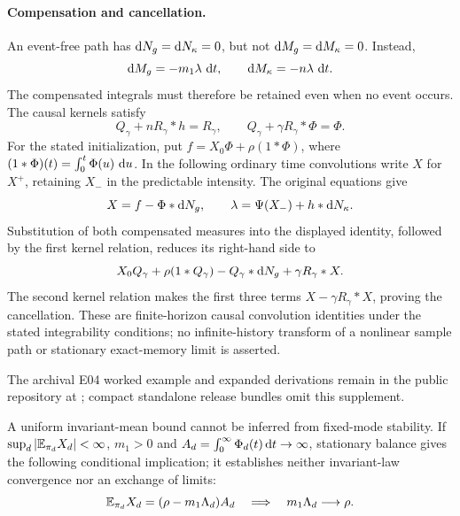 \paragraph{Compensation and cancellation.}
An event-free path has $\mathop{}\!\mathrm{d} N_g=\mathop{}\!\mathrm{d} N_\kappa=0$, but not
$\mathop{}\!\mathrm{d} M_g=\mathop{}\!\mathrm{d} M_\kappa=0$. Instead,
\[
  \mathop{}\!\mathrm{d} M_g=-m_1\lambda\,\mathop{}\!\mathrm{d} t,
  \qquad
  \mathop{}\!\mathrm{d} M_\kappa=-n\lambda\,\mathop{}\!\mathrm{d} t.
\]
The compensated integrals must therefore be retained even when no event
occurs. The causal kernels satisfy
\[
 Q_\gamma+nR_\gamma*h=R_\gamma,
 \qquad
 Q_\gamma+\gamma R_\gamma*\Phi=\Phi.
\]
For the stated initialization, put
$f=X_0\Phi+\rho(1*\Phi)$, where $(1*\Phi)(t)=\int_0^t\Phi(u)\,\mathop{}\!\mathrm{d} u$.
In the following ordinary time convolutions write $X$ for $X^+$, retaining
$X_-$ in the predictable intensity. The original equations give
\[
 X=f-\Phi*\mathop{}\!\mathrm{d} N_g,
 \qquad \lambda=\Psi(X_-)+h*\mathop{}\!\mathrm{d} N_\kappa.
\]
Substitution of both compensated measures into the displayed identity,
followed by the first kernel relation, reduces its right-hand side to
\[
 X_0Q_\gamma+\rho(1*Q_\gamma)-Q_\gamma*\mathop{}\!\mathrm{d} N_g
   +\gamma R_\gamma*X.
\]
The second kernel relation makes the first three terms
$X-\gamma R_\gamma*X$, proving the cancellation. These are finite-horizon
causal convolution identities under the stated integrability conditions;
no infinite-history transform of a nonlinear sample path or stationary
exact-memory limit is asserted.

The archival E04 worked example and expanded derivations remain in the public repository at ; compact standalone release bundles omit this supplement.

A uniform invariant-mean bound cannot be inferred from fixed-mode stability. If $\sup_d|\mathbb{E} _{\pi_d}X_d|<\infty$, $m_1>0$ and $A_d=\int_0^\infty\Phi_d(t)\mathop{}\!\mathrm{d} t\to\infty$, stationary balance gives the following conditional implication; it establishes neither invariant-law convergence nor an exchange of limits:
\[
\mathbb{E} _{\pi_d}X_d=(\rho-m_1\Lambda_d)A_d
\quad\Longrightarrow\quad
m_1\Lambda_d\longrightarrow\rho.
\]


